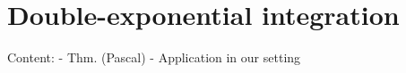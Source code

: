 \documentclass[main.tex]{subfiles}
\begin{document}
  \section{Double-exponential integration}

  Content: - Thm. (Pascal)
	   - Application in our setting
  
\end{document}
